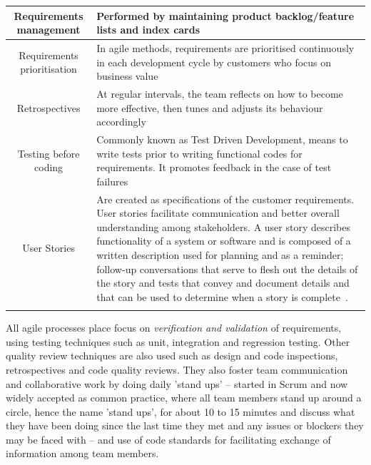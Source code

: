 \documentclass[dissertation,final]{softeng}
\begin{document}
\begin{table}[h!]
{\begin{tabularx}{\textwidth}{cX}
Requirements management &  Performed by maintaining
product backlog/feature lists and index cards\\ \midrule
Requirements prioritisation & In agile methods, requirements are prioritised continuously in each development cycle by customers who focus on business value\\ \midrule
Retrospectives & At regular intervals, the team reflects on how to become more effective, then tunes and adjusts its behaviour accordingly~\footnotemark\\ \midrule
Testing before coding & Commonly known as Test Driven Development, means to write tests prior to writing functional codes for requirements. It promotes feedback in the case of test failures\\ \midrule
User Stories & Are created as specifications of the customer requirements. User stories facilitate communication and better overall understanding among stakeholders. A user story describes functionality of a system or software and is composed of a written description used for planning and as a reminder; follow-up conversations that serve to flesh out the details of the story and tests that convey and document details and that can be used to determine when a story is complete~\citep{cohn2004user}.\\
\addlinespace
\bottomrule
\end{tabularx}
}
\end{table}

All agile processes place focus on \emph{verification and validation} of requirements, using testing techniques such as unit, integration and regression testing. Other quality review techniques are also used such as design and code inspections, retrospectives and code quality reviews. They also foster team communication and collaborative work by doing daily 'stand ups' -- started in Scrum and now widely accepted as common practice, where all team members stand up around a circle, hence the name 'stand ups', for about 10 to 15 minutes and discuss what they have been doing since the last time they met and any issues or blockers they may be faced with -- and use of code standards for facilitating exchange of information among team members.
\end{document}
